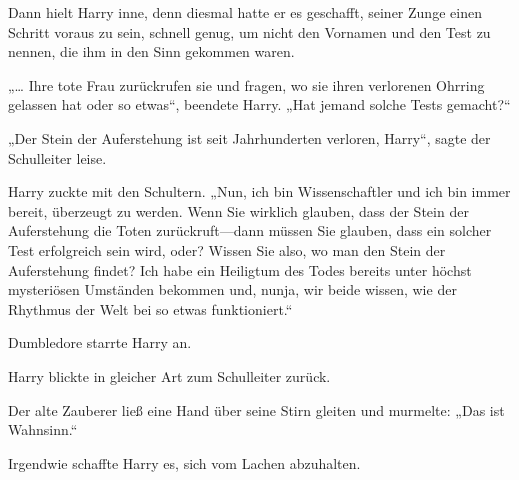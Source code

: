 Dann hielt Harry inne, denn diesmal hatte er es geschafft, seiner Zunge einen Schritt voraus zu sein, schnell genug, um nicht den Vornamen und den Test zu nennen, die ihm in den Sinn gekommen waren.

„… Ihre tote Frau zurückrufen sie und fragen, wo sie ihren verlorenen Ohrring gelassen hat oder so etwas“, beendete Harry. „Hat jemand solche Tests gemacht?“

„Der Stein der Auferstehung ist seit Jahrhunderten verloren, Harry“, sagte der Schulleiter leise.

Harry zuckte mit den Schultern. „Nun, ich bin Wissenschaftler und ich bin immer bereit, überzeugt zu werden. Wenn Sie wirklich glauben, dass der Stein der Auferstehung die Toten zurückruft—dann müssen Sie glauben, dass ein solcher Test erfolgreich sein wird, oder? Wissen Sie also, wo man den Stein der Auferstehung findet? Ich habe ein Heiligtum des Todes bereits unter höchst mysteriösen Umständen bekommen und, nunja, wir beide wissen, wie der Rhythmus der Welt bei so etwas funktioniert.“

Dumbledore starrte Harry an.

Harry blickte in gleicher Art zum Schulleiter zurück.

Der alte Zauberer ließ eine Hand über seine Stirn gleiten und murmelte: „Das ist Wahnsinn.“

Irgendwie schaffte Harry es, sich vom Lachen abzuhalten.

